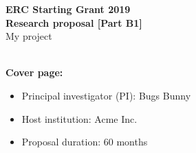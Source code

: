 %
%

\begin{center}
    \vbox{\vspace{1.5cm}}
    \Large{\textbf{%
        ERC Starting Grant 2019\\
        Research proposal [Part B1]\\}
    }
    \vspace{1cm}
    \huge{My project}\\
    \vspace{1cm}
    \huge{\project}\\
    \vspace{1cm}
\end{center}


\textbf{Cover page:}
\begin{itemize}
    \item Principal investigator (PI): Bugs Bunny
    \item Host institution: Acme Inc.
    \item Proposal duration: 60 months
\end{itemize}
% 
\fbox{\parbox{17cm}{}}
\vfill

\newpage

